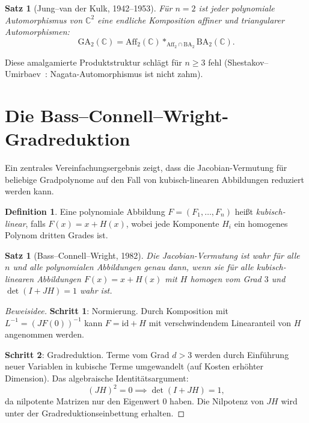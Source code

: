\documentclass[12pt,a4paper]{amsart}
\newtheorem{satz}[theorem]{Satz}
\theoremstyle{definition}
\newtheorem{definition_de}[theorem]{Definition}
\theoremstyle{remark}
\begin{document}
\begin{satz}[Jung--van der Kulk, 1942--1953]\label{satz:jung}
Für $n = 2$ ist jeder polynomiale Automorphismus von $\mathbb{C}^2$ eine endliche
Komposition affiner und triangularer Automorphismen:
\[
  \mathrm{GA}_2(\mathbb{C}) = \mathrm{Aff}_2(\mathbb{C}) *_{\mathrm{Aff}_2 \cap \mathrm{BA}_2} \mathrm{BA}_2(\mathbb{C}).
\]
\end{satz}

Diese amalgamierte Produktstruktur schlägt für $n \geq 3$ fehl
(Shestakov--Umirbaev~\cite{ShU04}: Nagata-Automorphismus ist nicht zahm).

\section{Die Bass--Connell--Wright-Gradreduktion}
\label{abschn:BCW}

Ein zentrales Vereinfachungsergebnis zeigt, dass die Jacobian-Vermutung für beliebige
Gradpolynome auf den Fall von kubisch-linearen Abbildungen reduziert werden kann.

\begin{definition_de}
Eine polynomiale Abbildung $F = (F_1,\ldots,F_n)$ heißt \emph{kubisch-linear}, falls
$F(x) = x + H(x)$, wobei jede Komponente $H_i$ ein homogenes Polynom dritten Grades ist.
\end{definition_de}

\begin{satz}[Bass--Connell--Wright, 1982]\label{satz:BCW}
Die Jacobian-Vermutung ist wahr für alle $n$ und alle polynomialen Abbildungen
genau dann, wenn sie für alle kubisch-linearen Abbildungen $F(x) = x + H(x)$ mit
$H$ homogen vom Grad $3$ und $\det(I + JH) = 1$ wahr ist.
\end{satz}

\begin{proof}[Beweisidee]
\textbf{Schritt 1}: Normierung. Durch Komposition mit $L^{-1} = (JF(0))^{-1}$
kann $F = \mathrm{id} + H$ mit verschwindendem Linearanteil von $H$ angenommen werden.

\textbf{Schritt 2}: Gradreduktion. Terme vom Grad $d > 3$ werden durch Einführung
neuer Variablen in kubische Terme umgewandelt (auf Kosten erhöhter Dimension).
Das algebraische Identitätsargument:
\[
  (JH)^2 = 0 \implies \det(I + JH) = 1,
\]
da nilpotente Matrizen nur den Eigenwert $0$ haben. Die Nilpotenz von $JH$ wird
unter der Gradreduktionseinbettung erhalten.
\end{proof}
\end{document}
